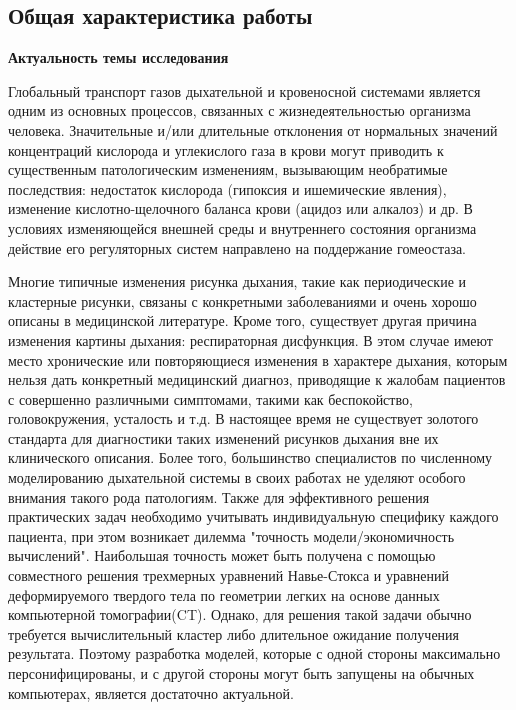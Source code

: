 \subsection*{\Large Общая характеристика работы}
\fontsize{14pt}{15pt}\selectfont
\textbf{Актуальность темы исследования} 

Глобальный транспорт газов дыхательной и кровеносной системами является одним из основных процессов, связанных с жизнедеятельностью организма человека. Значительные и/или длительные отклонения от нормальных значений концентраций кислорода и углекислого газа в крови могут приводить к существенным патологическим изменениям, вызывающим необратимые последствия: недостаток кислорода (гипоксия и ишемические явления), изменение кислотно-щелочного баланса крови (ацидоз или алкалоз) и др. В условиях изменяющейся внешней среды и внутреннего состояния организма действие его регуляторных систем направлено на поддержание гомеостаза. 

Многие типичные изменения рисунка дыхания, такие как периодические и кластерные рисунки, связаны с конкретными заболеваниями и очень хорошо описаны в медицинской литературе. Кроме того, существует другая причина изменения картины дыхания: респираторная дисфункция. В этом случае имеют место хронические или повторяющиеся изменения в характере дыхания, которым нельзя дать конкретный медицинский диагноз, приводящие к жалобам пациентов с совершенно различными симптомами, такими как беспокойство, головокружения, усталость и т.д. В настоящее время не существует золотого стандарта для диагностики таких изменений рисунков дыхания вне их клинического описания. Более того, большинство специалистов по численному моделированию дыхательной системы в своих работах не уделяют особого внимания такого рода патологиям. Также для эффективного решения практических задач необходимо учитывать индивидуальную специфику каждого пациента, при этом возникает дилемма "точность модели/экономичность вычислений". Наибольшая точность может быть получена с помощью совместного решения трехмерных уравнений Навье-Стокса и уравнений деформируемого твердого тела по геометрии легких на основе данных компьютерной томографии(CT). Однако, для решения такой задачи обычно требуется вычислительный кластер либо длительное ожидание получения результата. Поэтому разработка моделей, которые с одной стороны максимально персонифицированы, и с другой стороны могут быть запущены на обычных компьютерах, является достаточно актуальной. 

